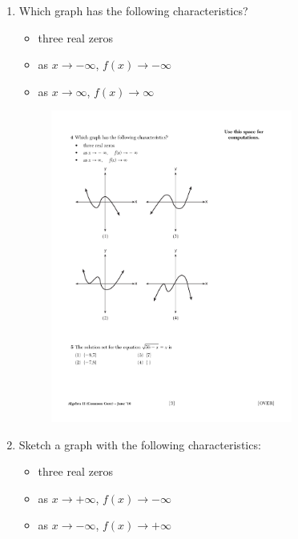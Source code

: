 \documentclass[12pt, oneside]{article}
\begin{document}
\begin{enumerate}
\item Which graph has the following characteristics?
\begin{itemize}
\item three real zeros
\item as $x \rightarrow - \infty$, $f(x) \rightarrow - \infty$
\item as $x \rightarrow \infty$, $f(x) \rightarrow \infty$
\end{itemize}
\begin{figure}[!ht]
    \centering
    \includegraphics[width=0.75\textwidth]{cubic-graphs.pdf}
\end{figure} %

\item Sketch a graph with the following characteristics: 
\begin{itemize}
\item three real zeros
\item as $x \rightarrow + \infty$, $f(x) \rightarrow - \infty$
\item as $x \rightarrow - \infty$, $f(x) \rightarrow + \infty$
\end{itemize}
\begin{center}
\end{center} %



\end{enumerate}
\end{document}
